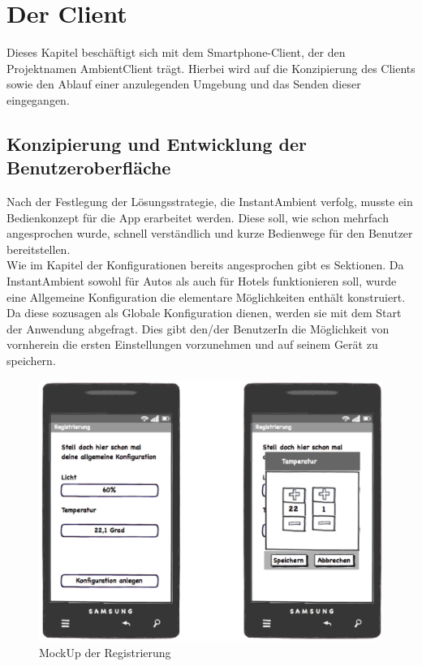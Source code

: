 \chapter{Der Client}
Dieses Kapitel beschäftigt sich mit dem Smartphone-Client, der den Projektnamen AmbientClient trägt. Hierbei wird auf die Konzipierung des Clients sowie den Ablauf einer anzulegenden Umgebung und das Senden dieser eingegangen. 

\section{Konzipierung und Entwicklung der Benutzeroberfläche}
Nach der Festlegung der Lösungsstrategie, die InstantAmbient verfolg, musste ein Bedienkonzept für die App erarbeitet werden. Diese soll, wie schon mehrfach angesprochen wurde, schnell verständlich und kurze Bedienwege für den Benutzer bereitstellen. \\ 
Wie im Kapitel der Konfigurationen bereits angesprochen gibt es Sektionen. Da InstantAmbient sowohl für Autos als auch für Hotels funktionieren soll, wurde eine Allgemeine Konfiguration die elementare Möglichkeiten enthält konstruiert. Da diese sozusagen als Globale Konfiguration dienen, werden sie mit dem Start der Anwendung abgefragt. Dies gibt den/der BenutzerIn die Möglichkeit von vornherein die ersten Einstellungen vorzunehmen und auf seinem Gerät zu speichern.  

\begin{figure}[H]
\includegraphics[width=12.5cm]{MockUps/Registrierung}
\caption{MockUp der Registrierung}
\end{figure}

